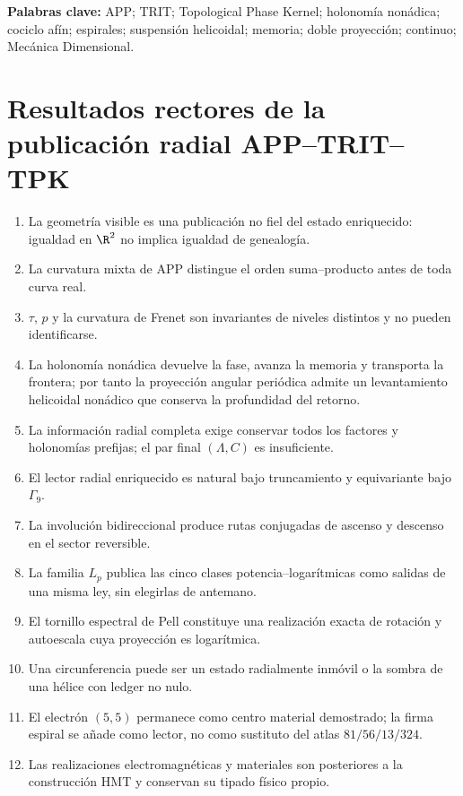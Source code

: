 \bigskip
\noindent\textbf{Palabras clave:} APP; TRIT; Topological Phase Kernel;
holonomía nonádica; cociclo afín; espirales; suspensión helicoidal; memoria;
doble proyección; continuo; Mecánica Dimensional.

\part{Resultados rectores de la publicación radial APP--TRIT--TPK}
\begin{enumerate}[label=\textbf{R\arabic*.},leftmargin=12mm]
\item La geometría visible es una publicación no fiel del estado enriquecido:
igualdad en \(\R^2\) no implica igualdad de genealogía.
\item La curvatura mixta de APP distingue el orden suma--producto antes de
toda curva real.
\item \(\tau\), \(p\) y la curvatura de Frenet son invariantes de niveles
distintos y no pueden identificarse.
\item La holonomía nonádica devuelve la fase, avanza la memoria y transporta
la frontera; por tanto la proyección angular periódica admite un levantamiento
helicoidal nonádico que conserva la profundidad del retorno.
\item La información radial completa exige conservar todos los factores y
holonomías prefijas; el par final \((\Lambda,C)\) es insuficiente.
\item El lector radial enriquecido es natural bajo truncamiento y
equivariante bajo \(\Gamma_9\).
\item La involución bidireccional produce rutas conjugadas de ascenso y
descenso en el sector reversible.
\item La familia \(L_p\) publica las cinco clases potencia--logarítmicas como
salidas de una misma ley, sin elegirlas de antemano.
\item El tornillo espectral de Pell constituye una realización exacta de
rotación y autoescala cuya proyección es logarítmica.
\item Una circunferencia puede ser un estado radialmente inmóvil o la sombra
de una hélice con ledger no nulo.
\item El electrón \((5,5)\) permanece como centro material demostrado; la
firma espiral se añade como lector, no como sustituto del atlas
\(81/56/13/324\).
\item Las realizaciones electromagnéticas y materiales son posteriores a la
construcción HMT y conservan su tipado físico propio.
\end{enumerate}

